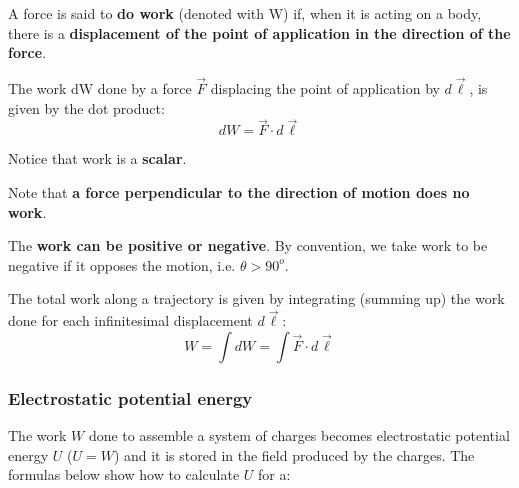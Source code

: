 \documentclass[english,11pt]{article}
\begin{document}
        \begin{itemize}
        {\small
          \item
          A force is said to {\bf do work} (denoted with W) if, when it is acting on a body,
          there is a {\bf displacement of the point of application in the direction of the force}.
          \item
          The work dW done by a force $\vec{F}$ displacing the point of application by $d\vec{\ell}$,
          is given by the dot product:
              \begin{equation*}
                dW = \vec{F} \cdot d\vec{\ell}
              \end{equation*}
          \item
          Notice that work is a {\bf scalar}.
          \item
          Note that {\bf a force perpendicular to the direction of motion does no work}.
          \item
          The {\bf work can be positive or negative}.
          By convention, we take work to be negative if it opposes the motion, i.e. $\theta > 90^{o}$.
          \item
          The total work along a trajectory is given by integrating (summing up) the work done for
          each infinitesimal displacement $d\vec{\ell}$:
             \begin{equation*}
                W = \int dW = \int \vec{F} \cdot d\vec{\ell}
             \end{equation*}
       }
       \end{itemize}

\subsubsection*{\bf Electrostatic potential energy}

The work $W$ done to assemble a system of charges becomes
electrostatic potential energy $U$ ($U=W$)
and it is stored in the field produced by the charges.
The formulas below show how to calculate $U$ for a:
\end{document}
